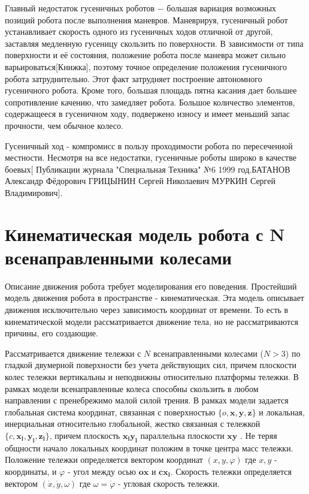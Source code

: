 \documentclass[oneside,final,14pt]{extreport}
\newcommand{\bs}{\boldsymbol}
\begin{document}
Главный недостаток гусеничных роботов $-$ большая вариация возможных позиций робота после выполнения маневров. Маневрируя, гусеничный робот устанавливает скорость одного из гусеничных ходов отличной от другой, заставляя медленную гусеницу скользить по поверхности. В зависимости от типа поверхности и её состояния, положение робота после маневра может сильно варьироваться[Книжка], поэтому точное определение положения гусеничного робота затруднительно. Этот факт затрудняет построение автономного гусеничного робота. Кроме того, большая площадь пятна касания дает большее сопротивление качению, что замедляет робота. Большое количество элементов, содержащееся в гусеничном ходу, подвержено износу и имеет меньший запас прочности, чем обычное колесо. 

Гусеничный ход - компромисс в пользу проходимости робота по пересеченной местности. Несмотря на все недостатки, гусеничные роботы широко в качестве боевых[ Публикации журнала "Специальная Техника" №6 1999 год.БАТАНОВ Александр Фёдорович
ГРИЦЫНИН Сергей Николаевич
МУРКИН Сергей Владимирович].

\chapter{Кинематическая модель робота с N всенаправленными колесами}   
Описание движения робота требует моделирования его поведения. Простейший модель движения робота в пространстве - кинематическая. Эта модель описывает движения исключительно через зависимость координат от времени. То есть в кинематической модели рассматривается движение тела, но не рассматриваются причины, его создающие.

Рассматривается движение тележки с $N$ всенаправленными колесами ($N > 3$) по гладкой двумерной поверхности без учета действующих сил, причем плоскости колес тележки вертикальны и неподвижны относительно платформы тележки. В рамках модели всенаправленные колеса способны скользить в любом направлении с пренебрежимо малой силой трения. В рамках модели задается глобальная система координат, связанная с поверхностью $\{o,\boldsymbol{x},\bs{y},\bs{z}\}$ и локальная,  инерциальная относительно глобальной, жестко связанная с тележкой $\{c,\bs{x_{l}},\bs{y_{l}},\bs{z_{l}}\}$, причем плоскость $\bs{x_{l}}\bs{y_{l}}$  параллельна плоскости $\bs{x}\bs{y}$ . Не теряя общности начало локальных координат положим в точке центра масс тележки. Положение тележки определяется вектором координат $(x,y,\varphi)$
где $x,y$ - координаты, и $\varphi$ -  угол между осью $\bs{ox}$ и $\bs{cx_{l}}$. Скорость тележки определяется вектором $(\dot{x},\dot{y},\omega)$ где $\omega = \dot{\varphi}$ - угловая скорость тележки. 
\end{document}
